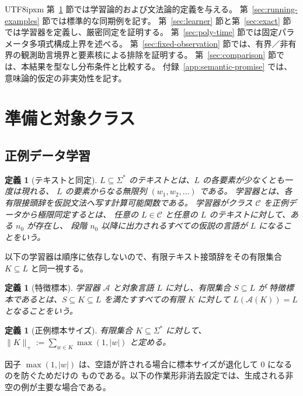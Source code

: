 \documentclass[10pt,a4paper]{article}
\newtheorem{definition}[theorem]{定義}
\theoremstyle{remark}
\begin{document}
\begin{CJK}{UTF8}{ipxm}
第~\ref{sec:prelim} 節では学習論的および文法論的定義を与える。
第~\ref{sec:running-examples} 節では標準的な同期例を記す。
第~\ref{sec:learner} 節と第~\ref{sec:exact} 節では学習器を定義し、厳密同定を証明する。
第~\ref{sec:poly-time} 節では固定パラメータ多項式構成上界を述べる。
第~\ref{sec:fixed-observation} 節では、有界／非有界の観測助言境界と要素核による排除を証明する。
第~\ref{sec:comparison} 節では、本結果を型なし分布条件と比較する。
付録~\ref{app:semantic-promise} では、意味論的仮定の非実効性を記す。

\section{準備と対象クラス}
\label{sec:prelim}

\subsection{正例データ学習}

\begin{definition}[テキストと同定]
\(L\subseteq\Sigma^*\) の\emph{テキスト}とは、\(L\) の各要素が少なくとも一度は現れる、
\(L\) の要素からなる無限列 \((w_1,w_2,\ldots)\) である。
学習器とは、各有限接頭辞を仮説文法へ写す計算可能関数である。
学習器がクラス \(\mathcal C\) を正例データから\emph{極限同定する}とは、
任意の \(L\in\mathcal C\) と任意の \(L\) のテキストに対して、ある \(n_0\) が存在し、
段階 \(n_0\) 以降に出力されるすべての仮説の言語が \(L\) になることをいう。
\end{definition}

以下の学習器は順序に依存しないので、有限テキスト接頭辞をその有限集合
\(K\subseteq L\) と同一視する。

\begin{definition}[特徴標本]
学習器 \(\mathcal A\) と対象言語 \(L\) に対し、有限集合 \(S\subseteq L\) が
\emph{特徴標本}であるとは、\(S\subseteq K\subseteq L\) を満たすすべての有限 \(K\) に対して
\(L(\mathcal A(K))=L\) となることをいう。
\end{definition}

\begin{definition}[正例標本サイズ]
有限集合 \(K\subseteq\Sigma^*\) に対して、
\(\|K\|_+:=\sum_{w\in K}\max(1,|w|)\) と定める。
\end{definition}

因子 \(\max(1,|w|)\) は、空語が許される場合に標本サイズが退化して 0 になるのを防ぐためだけの
ものである。以下の作業形非消去設定では、生成される非空の例が主要な場合である。


\end{CJK}
\end{document}
